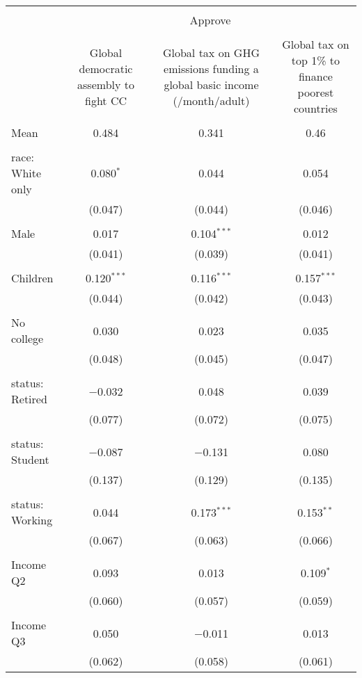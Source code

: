 
\begin{tabular}{@{\extracolsep{5pt}}lccc} 
\\[-1.8ex]\hline 
\hline \\[-1.8ex] 
 & \multicolumn{3}{c}{Approve} \\ 
\cline{2-4} 
\\[-1.8ex] & Global democratic assembly to fight CC & Global tax on GHG emissions funding a global basic income (\textdollar 30/month/adult) & Global tax on top 1\% to finance poorest countries \\ 
\hline \\[-1.8ex] 
 Mean & 0.484 & 0.341 & 0.46  \\ \hline \\[-1.8ex] race: White only & 0.080$^{*}$ & 0.044 & 0.054 \\ 
  & (0.047) & (0.044) & (0.046) \\ 
  & & & \\ 
 Male & 0.017 & 0.104$^{***}$ & 0.012 \\ 
  & (0.041) & (0.039) & (0.041) \\ 
  & & & \\ 
 Children & 0.120$^{***}$ & 0.116$^{***}$ & 0.157$^{***}$ \\ 
  & (0.044) & (0.042) & (0.043) \\ 
  & & & \\ 
 No college & 0.030 & 0.023 & 0.035 \\ 
  & (0.048) & (0.045) & (0.047) \\ 
  & & & \\ 
 status: Retired & $-$0.032 & 0.048 & 0.039 \\ 
  & (0.077) & (0.072) & (0.075) \\ 
  & & & \\ 
 status: Student & $-$0.087 & $-$0.131 & 0.080 \\ 
  & (0.137) & (0.129) & (0.135) \\ 
  & & & \\ 
 status: Working & 0.044 & 0.173$^{***}$ & 0.153$^{**}$ \\ 
  & (0.067) & (0.063) & (0.066) \\ 
  & & & \\ 
 Income Q2 & 0.093 & 0.013 & 0.109$^{*}$ \\ 
  & (0.060) & (0.057) & (0.059) \\ 
  & & & \\ 
 Income Q3 & 0.050 & $-$0.011 & 0.013 \\ 
  & (0.062) & (0.058) & (0.061) \\ 

\end{tabular}
